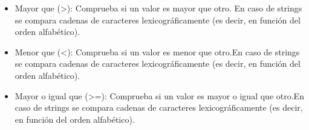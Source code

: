\begin{itemize}
    \item Mayor que (>): Comprueba si un valor es mayor que otro. En caso de strings se compara cadenas de caracteres lexicográficamente (es decir, en función del orden alfabético).
    \begin{figure}[h]
      \centering
    \end{figure}
\newpage
    \item Menor que (<): Comprueba si un valor es menor que otro.En caso de strings se compara cadenas de caracteres lexicográficamente (es decir, en función del orden alfabético).
    \begin{figure}[h]
      \centering
    \end{figure}
\newpage
    \item Mayor o igual que (>=): Comprueba si un valor es mayor o igual que otro.En caso de strings se compara cadenas de caracteres lexicográficamente (es decir, en función del orden alfabético).
    \begin{figure}[h]
      \centering
    \end{figure}


\end{itemize}

